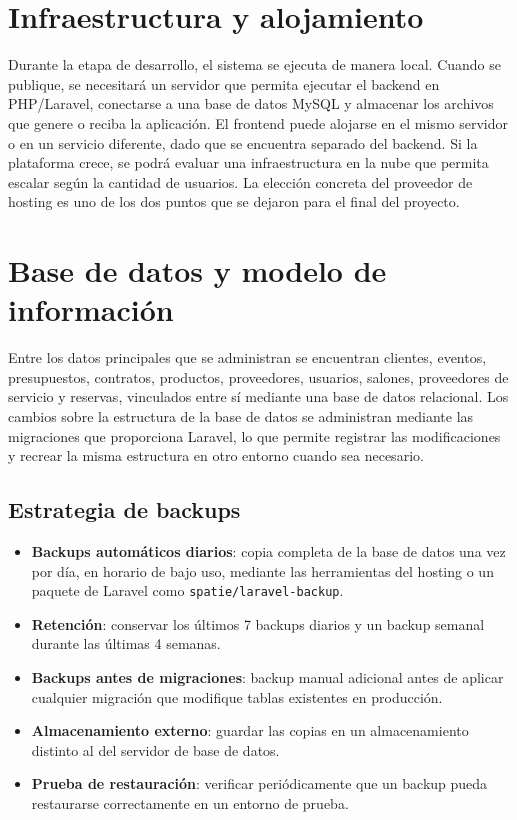 \section{Infraestructura y alojamiento}

Durante la etapa de desarrollo, el sistema se ejecuta de manera local.
Cuando se publique, se necesitará un servidor que permita ejecutar el
backend en PHP/Laravel, conectarse a una base de datos MySQL y almacenar
los archivos que genere o reciba la aplicación. El frontend puede
alojarse en el mismo servidor o en un servicio diferente, dado que se
encuentra separado del backend. Si la plataforma crece, se podrá evaluar
una infraestructura en la nube que permita escalar según la cantidad de
usuarios. La elección concreta del proveedor de hosting es uno de los dos
puntos que se dejaron para el final del proyecto.

\section{Base de datos y modelo de información}

Entre los datos principales que se administran se encuentran clientes,
eventos, presupuestos, contratos, productos, proveedores, usuarios,
salones, proveedores de servicio y reservas, vinculados entre sí mediante
una base de datos relacional. Los cambios sobre la estructura de la base
de datos se administran mediante las migraciones que proporciona
Laravel, lo que permite registrar las modificaciones y recrear la misma
estructura en otro entorno cuando sea necesario.

\subsection{Estrategia de backups}

\begin{itemize}
    \item \textbf{Backups automáticos diarios}: copia completa de la
          base de datos una vez por día, en horario de bajo uso, mediante
          las herramientas del hosting o un paquete de Laravel como
          \texttt{spatie/laravel-backup}.
    \item \textbf{Retención}: conservar los últimos 7 backups diarios y
          un backup semanal durante las últimas 4 semanas.
    \item \textbf{Backups antes de migraciones}: backup manual adicional
          antes de aplicar cualquier migración que modifique tablas
          existentes en producción.
    \item \textbf{Almacenamiento externo}: guardar las copias en un
          almacenamiento distinto al del servidor de base de datos.
    \item \textbf{Prueba de restauración}: verificar periódicamente que
          un backup pueda restaurarse correctamente en un entorno de
          prueba.
\end{itemize}


